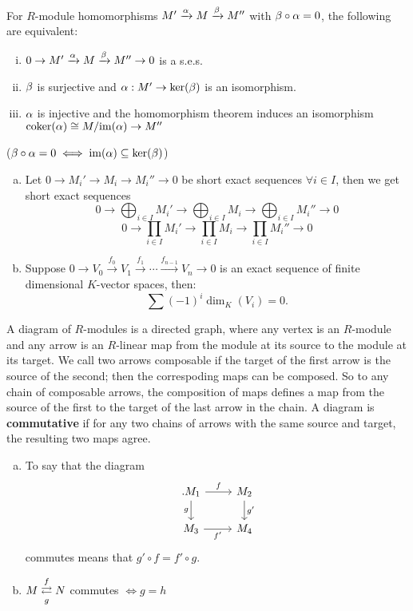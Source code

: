 \documentclass[a4paper]{report}
\begin{document}
\begin{rem*}
  For $R$-module homomorphisms $M' \xrightarrow {\alpha} M \xrightarrow {\beta} M''$ with $\beta \circ \alpha = 0$, the following are equivalent:
  \begin{enumerate}[(i)]
    \item $0 \to M' \xrightarrow {\alpha} M \xrightarrow {\beta} M'' \to 0$ is a s.e.s.
    \item $\beta$ is surjective and $\alpha: M' \to \ker(\beta)$ is an isomorphism.
          \item $\alpha$ is injective and the homomorphism theorem induces an isomorphism $\mathrm{coker}(\a) \cong \fak M{\mathrm{im}(\a)} \to M''$
  \end{enumerate}
  ($\beta \circ \alpha = 0 \iff \mathrm{im}(\alpha) \subseteq \ker(\beta)$)
\end{rem*}


\begin{prop}[Exercise]
\begin{enumerate}[(a)]
  \item Let $0 \to M_{i}' \to M_{i} \to M_{i}'' \to 0$ be short exact sequences $\forall i \in I$, then we get short exact sequences
        \[0 \to \bigoplus_{i \in I}M_{i}' \to \bigoplus_{i \in I}M_{i} \to \bigoplus_{i \in I}M_{i}'' \to 0\]
        \[0 \to \prod_{i \in I}M_{i}' \to \prod_{i \in I}M_{i} \to \prod_{i \in I}M_{i}'' \to 0\]
      \item Suppose $0 \to V_{0} \xrightarrow {f_{0}} V_{1} \xrightarrow{f_{1}} \cdots \xrightarrow {f_{n-1}} V_{n} \to 0$ is an exact sequence of finite dimensional $K$-vector spaces, then: \[\sum(-1)^{i} \dim_{K}(V_{i}) = 0.\]
\end{enumerate}

\end{prop}

\begin{nota}
A diagram of $R$-modules is a directed graph, where any vertex is an $R$-module and any arrow is an $R$-linear map from the module at its source to the module at its target. We call two arrows composable if the target of the first arrow is the source of the second; then the correspoding maps can be composed. So to any chain of composable arrows, the composition of maps defines a map from the source of the first to the target of the last arrow in the chain. A diagram is \textbf{commutative} if for any two chains of arrows with the same source and target, the resulting two maps agree.
\end{nota}
\begin{exmp*}
  \begin{enumerate}[(a)]
  \item To say that the diagram
\[\begin{tikzcd}.
M_1 \arrow[r, "f"] \arrow[d, "g"'] & M_2 \arrow[d, "g'"] \\
M_3 \arrow[r, "f'"']               & M_4
\end{tikzcd}\]
commutes means that $g' \circ f = f' \circ g$.
\item $M \overunderset fg \rightleftarrows N$ commutes $\iff g = h$
   \end{enumerate}
 \end{exmp*}
\end{document}

